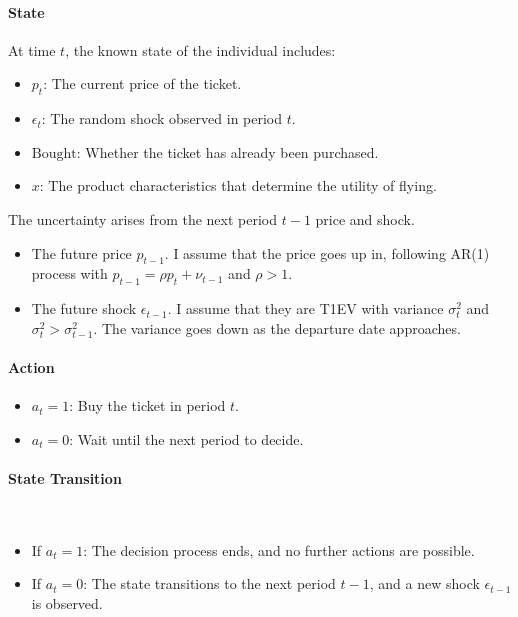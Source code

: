 \documentclass[12pt]{article}
\begin{document}
\paragraph{State} At time \( t \), the known state of the individual includes:
\begin{itemize}
    \item \( p_t \): The current price of the ticket.
    \item \( \epsilon_t \): The random shock observed in period \( t \).
    \item \( \text{Bought}\): Whether the ticket has already been purchased.
    \item \( x \): The product characteristics that determine the utility of flying.
\end{itemize}
The uncertainty arises from the next period \( t-1 \) price and shock.
\begin{itemize}
    \item The future price $p_{t-1}$. I assume that the price goes up in, following AR(1)
          process with $p_{t-1}=\rho p_t + \nu_{t-1}$ and $\rho>1$.
    \item The future shock $\epsilon_{t-1}$. I assume that they are T1EV with variance
          \(\sigma_t^2\) and $\sigma_{t}^2>\sigma_{t-1}^2$. The variance goes down as the
          departure date approaches.
\end{itemize}
\paragraph{Action}
\begin{itemize}
    \item \( a_t = 1 \): Buy the ticket in period \( t \).
    \item \( a_t = 0 \): Wait until the next period to decide.
\end{itemize}

\paragraph{State Transition}\
\begin{itemize}
    \item If \( a_t = 1 \): The decision process ends, and no further actions are
          possible.
    \item If \( a_t = 0 \): The state transitions to the next period \( t - 1 \), and a
          new shock \(\epsilon_{t-1}\) is observed.
\end{itemize}
\end{document}
